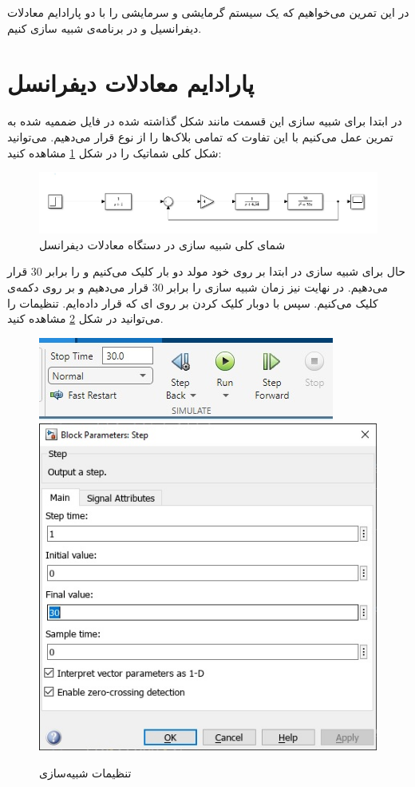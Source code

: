 \documentclass[]{article}
\begin{document}
\printheader
در این تمرین می‌خواهیم که یک سیستم گرمایشی و سرمایشی را با دو پارادایم معادلات دیفرانسیل و
در برنامه‌ی
شبیه سازی کنیم.

\section{پارادایم معادلات دیفرانسل}
در ابتدا برای شبیه سازی این قسمت مانند شکل گذاشته شده در فایل
ضممیه شده به تمرین عمل می‌کنیم با این تفاوت که تمامی بلاک‌ها را از نوع
قرار می‌دهیم. می‌توانید شکل کلی شماتیک را در شکل
\ref{fig:diff:schema}
مشاهده کنید:
\begin{figure}[H]
    \centering
    \includegraphics[scale=0.5]{pics/diff.jpg}
    \caption{شمای کلی شبیه سازی در دستگاه معادلات دیفرانسل}
    \label{fig:diff:schema}
\end{figure}
حال برای شبیه سازی در ابتدا بر روی خود مولد
دو بار کلیک می‌کنیم و
را برابر 30 قرار می‌دهیم. در نهایت نیز زمان شبیه سازی را برابر 30 قرار می‌دهیم و بر روی دکمه‌ی
کلیک می‌کنیم. سپس با دوبار کلیک کردن بر روی
ای
که قرار داده‌ایم. تنظیمات را می‌توانید در شکل
\ref{fig:diff:settings}
مشاهده کنید.
\begin{figure}[H]
    \centering
    \includegraphics[scale=0.8]{pics/diff_simulate.jpg}
    \includegraphics[scale=0.5]{pics/step.jpg}
    \caption{تنظیمات شبیه‌سازی}
    \label{fig:diff:settings}
\end{figure}
\end{document}
